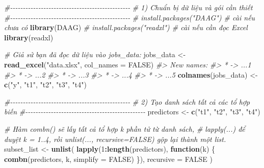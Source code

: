 \documentclass[
]{article}
\newenvironment{Shaded}{\begin{snugshade}}{\end{snugshade}}
\newcommand{\AttributeTok}[1]{\textcolor[rgb]{0.13,0.29,0.53}{#1}}
\newcommand{\CommentTok}[1]{\textcolor[rgb]{0.56,0.35,0.01}{\textit{#1}}}
\newcommand{\ConstantTok}[1]{\textcolor[rgb]{0.56,0.35,0.01}{#1}}
\newcommand{\ControlFlowTok}[1]{\textcolor[rgb]{0.13,0.29,0.53}{\textbf{#1}}}
\newcommand{\DecValTok}[1]{\textcolor[rgb]{0.00,0.00,0.81}{#1}}
\newcommand{\FunctionTok}[1]{\textcolor[rgb]{0.13,0.29,0.53}{\textbf{#1}}}
\newcommand{\NormalTok}[1]{#1}
\newcommand{\OtherTok}[1]{\textcolor[rgb]{0.56,0.35,0.01}{#1}}
\newcommand{\SpecialCharTok}[1]{\textcolor[rgb]{0.81,0.36,0.00}{\textbf{#1}}}
\newcommand{\StringTok}[1]{\textcolor[rgb]{0.31,0.60,0.02}{#1}}
\begin{document}
\begin{Shaded}
\begin{Highlighting}[]
\CommentTok{\#{-}{-}{-}{-}{-}{-}{-}{-}{-}{-}{-}{-}{-}{-}{-}{-}{-}{-}{-}{-}{-}{-}{-}{-}{-}{-}{-}{-}{-}{-}{-}{-}{-}{-}{-}{-}{-}{-}{-}{-}{-}{-}{-}{-}{-}{-}{-}}
\CommentTok{\# 1) Chuẩn bị dữ liệu và gói cần thiết}
\CommentTok{\#{-}{-}{-}{-}{-}{-}{-}{-}{-}{-}{-}{-}{-}{-}{-}{-}{-}{-}{-}{-}{-}{-}{-}{-}{-}{-}{-}{-}{-}{-}{-}{-}{-}{-}{-}{-}{-}{-}{-}{-}{-}{-}{-}{-}{-}{-}{-}}
\CommentTok{\# install.packages("DAAG") \# cài nếu chưa có}
\FunctionTok{library}\NormalTok{(DAAG)}
\CommentTok{\# install.packages("readxl") \# cài nếu cần đọc Excel}
\FunctionTok{library}\NormalTok{(readxl)}

\CommentTok{\# Giả sử bạn đã đọc dữ liệu vào jobs\_data:}
\NormalTok{jobs\_data }\OtherTok{\textless{}{-}} \FunctionTok{read\_excel}\NormalTok{(}\StringTok{"data.xlsx"}\NormalTok{, }\AttributeTok{col\_names =} \ConstantTok{FALSE}\NormalTok{)}
\CommentTok{\#\textgreater{} New names:}
\CommentTok{\#\textgreater{} * \textasciigrave{}\textasciigrave{} {-}\textgreater{} \textasciigrave{}...1\textasciigrave{}}
\CommentTok{\#\textgreater{} * \textasciigrave{}\textasciigrave{} {-}\textgreater{} \textasciigrave{}...2\textasciigrave{}}
\CommentTok{\#\textgreater{} * \textasciigrave{}\textasciigrave{} {-}\textgreater{} \textasciigrave{}...3\textasciigrave{}}
\CommentTok{\#\textgreater{} * \textasciigrave{}\textasciigrave{} {-}\textgreater{} \textasciigrave{}...4\textasciigrave{}}
\CommentTok{\#\textgreater{} * \textasciigrave{}\textasciigrave{} {-}\textgreater{} \textasciigrave{}...5\textasciigrave{}}
\FunctionTok{colnames}\NormalTok{(jobs\_data) }\OtherTok{\textless{}{-}} \FunctionTok{c}\NormalTok{(}\StringTok{"y"}\NormalTok{, }\StringTok{"t1"}\NormalTok{, }\StringTok{"t2"}\NormalTok{, }\StringTok{"t3"}\NormalTok{, }\StringTok{"t4"}\NormalTok{)}

\CommentTok{\#{-}{-}{-}{-}{-}{-}{-}{-}{-}{-}{-}{-}{-}{-}{-}{-}{-}{-}{-}{-}{-}{-}{-}{-}{-}{-}{-}{-}{-}{-}{-}{-}{-}{-}{-}{-}{-}{-}{-}{-}{-}{-}{-}{-}{-}{-}{-}}
\CommentTok{\# 2) Tạo danh sách tất cả các tổ hợp biến}
\CommentTok{\#{-}{-}{-}{-}{-}{-}{-}{-}{-}{-}{-}{-}{-}{-}{-}{-}{-}{-}{-}{-}{-}{-}{-}{-}{-}{-}{-}{-}{-}{-}{-}{-}{-}{-}{-}{-}{-}{-}{-}{-}{-}{-}{-}{-}{-}{-}{-}}
\NormalTok{predictors }\OtherTok{\textless{}{-}} \FunctionTok{c}\NormalTok{(}\StringTok{"t1"}\NormalTok{, }\StringTok{"t2"}\NormalTok{, }\StringTok{"t3"}\NormalTok{, }\StringTok{"t4"}\NormalTok{)}

\CommentTok{\# Hàm combn() sẽ lấy tất cả tổ hợp k phần tử từ danh sách, }
\CommentTok{\# lapply(...) để duyệt k = 1..4, rồi unlist(..., recursive=FALSE) gộp lại thành một list.}
\NormalTok{subset\_list }\OtherTok{\textless{}{-}} \FunctionTok{unlist}\NormalTok{(}
  \FunctionTok{lapply}\NormalTok{(}\DecValTok{1}\SpecialCharTok{:}\FunctionTok{length}\NormalTok{(predictors), }\ControlFlowTok{function}\NormalTok{(k) \{}
    \FunctionTok{combn}\NormalTok{(predictors, k, }\AttributeTok{simplify =} \ConstantTok{FALSE}\NormalTok{)}
\NormalTok{  \}),}
  \AttributeTok{recursive =} \ConstantTok{FALSE}
\NormalTok{)}


\end{Highlighting}
\end{Shaded}
\end{document}
